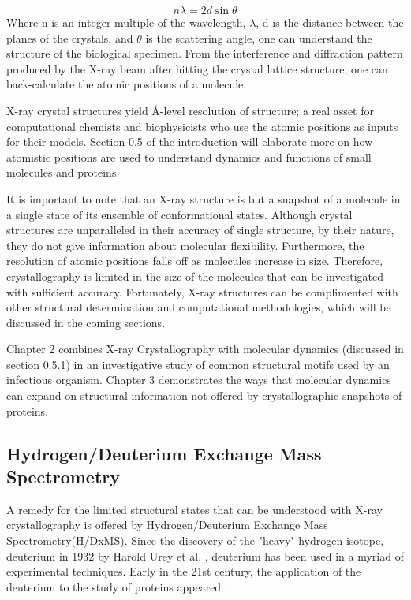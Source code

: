 \documentclass[12pt]{ucsddissertation}
\begin{document}
\begin{dissertationintroduction}
\begin{equation}
n\lambda=2d\sin\theta
\end{equation}
Where n is an integer multiple of the wavelength, $\lambda$, d is the distance between the planes of the crystals, and $\theta$ is the scattering angle, one can understand the structure of the biological specimen. From the interference and diffraction pattern produced by the X-ray beam after hitting the crystal lattice structure, one can back-calculate the atomic positions of a molecule. 

X-ray crystal structures yield \si{\angstrom}-level resolution of structure; a real asset for computational chemists and biophysicists who use the atomic positions as inputs for their models. Section 0.5 of the introduction will elaborate more on how atomistic positions are used to understand dynamics and functions of small molecules and proteins. 

It is important to note that an X-ray structure is but a snapshot of a molecule in a single state of its ensemble of conformational states. Although crystal structures are unparalleled in their accuracy of single structure, by their nature, they do not give information about molecular flexibility.  Furthermore, the resolution of atomic positions falls off as molecules increase in size. Therefore, crystallography is limited in the size of the molecules that can be investigated with sufficient accuracy. Fortunately, X-ray structures can be complimented with other structural determination and computational methodologies, which will be discussed in the coming sections. 

Chapter 2 combines X-ray Crystallography with molecular dynamics (discussed in section 0.5.1) in an investigative study of common structural motifs used by an infectious organism. Chapter 3 demonstrates the ways that molecular dynamics can expand on structural information not offered by crystallographic snapshots of proteins. 

\subsection{Hydrogen/Deuterium Exchange Mass Spectrometry}
A remedy for the limited structural states that can be understood with X-ray crystallography is offered by Hydrogen/Deuterium Exchange Mass Spectrometry(H/DxMS).  Since the discovery of the "heavy" hydrogen isotope, deuterium in 1932 by Harold Urey et al. \cite{Urey1932}, deuterium has been used in a myriad of experimental techniques. Early in the 21st century, the application of the deuterium to the study of proteins appeared \cite{Engen2001}. 


\end{dissertationintroduction}
\end{document}
